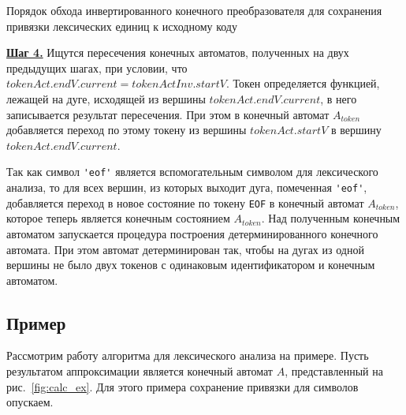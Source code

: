 \documentclass[10pt, conference, compsocconf]{IEEEtran}
\begin{document}
\begin{algorithm}
\begin{algorithmic}

                \EndIf    
            \Else
            \EndIf
        \EndFor
    \EndIf
\EndWhile
\EndFunction
\end{algorithmic}
\caption{Порядок обхода инвертированного конечного преобразователя для сохранения привязки лексических единиц к исходному коду}
\label{algo:bfsInv}
\end{algorithm}

\textbf{\underline{Шаг 4.}} Ищутся пересечения конечных автоматов, полученных на двух предыдущих шагах, при условии, что  $tokenAct.endV.current = tokenActInv.startV$. Токен определяется функцией, лежащей на дуге, исходящей из вершины $tokenAct.endV.current$, в него записывается результат пересечения. При этом в конечный автомат $A_{token}$ добавляется переход по этому токену из вершины $tokenAct.startV$ в  вершину $tokenAct.endV.current$. 

Так как символ \verb|'eof'| является вспомогательным символом для лексического анализа, то для всех вершин, из которых выходит дуга, помеченная \verb|'eof'|, добавляется переход в новое состояние по токену \verb|EOF| в конечный автомат $A_{token}$, которое теперь является конечным состоянием $A_{token}$. Над полученным конечным автоматом запускается процедура построения детерминированного конечного автомата. При этом автомат детерминирован так, чтобы на дугах из одной вершины не было двух токенов с одинаковым идентификатором и конечным автоматом.

\subsection{Пример}
Рассмотрим работу алгоритма для лексического анализа на примере. Пусть результатом аппроксимации является конечный автомат $A$, представленный на рис.~\ref{fig:calc_ex}. Для этого примера сохранение привязки для символов опускаем. 
\end{document}
